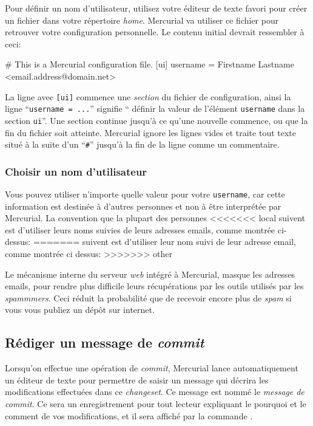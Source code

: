 Pour définir un nom d'utilisateur, utilisez votre éditeur de texte favori
pour créer un fichier  dans votre répertoire \textit{home}.
Mercurial va utiliser ce fichier pour retrouver votre configuration personnelle.
Le contenu initial devrait ressembler à ceci:
\begin{codesample2}
  # This is a Mercurial configuration file.
  [ui]
  username = Firstname Lastname <email.address@domain.net>
\end{codesample2}
La ligne avec \texttt{[ui]} commence une \emph{section} du fichier de
configuration, ainsi la ligne ``\texttt{username = ...}'' signifie ``
définir la valeur de l'élément \texttt{username} dans la section 
\texttt{ui}''. Une section continue jusqu'à ce qu'une nouvelle 
commence, ou que la fin du fichier soit atteinte. Mercurial ignore
les lignes vides et traite tout texte situé à la suite d'un  
``\texttt{\#}'' jusqu'à la fin de la ligne comme un commentaire.

\subsubsection{Choisir un nom d'utilisateur}

Vous pouvez utiliser n'importe quelle valeur pour votre \texttt{username},
car cette information est destinée à d'autres personnes et non à être
interprétée par Mercurial. La convention que la plupart des personnes
<<<<<<< local
suivent est d'utiliser leurs noms suivies de leurs adresses emails,
comme montrée ci-dessus:
=======
suivent est d'utiliser leur nom suivi de leur adresse email,
comme montrée ci dessus:
>>>>>>> other

\begin{note}
  Le mécanisme interne du serveur \textit{web} intégré à Mercurial,
  masque les adresses emails, pour rendre plus difficile leurs
  récupérations par les outils utilisés par les \textit{spammmers}.
  Ceci réduit la probabilité que de recevoir encore plus de 
  \textit{spam} si vous vous publiez un dépôt sur internet.
\end{note}

\subsection{Rédiger un message de \textit{commit}}

Lorsqu'on effectue une opération de \textit{commit}, Mercurial 
lance automatiquement un éditeur de texte pour permettre de saisir
un message qui décrira les modifications effectuées dans ce 
\textit{changeset}. Ce message est nommé le \emph{message de 
\textit{commit}}. Ce sera un enregistrement pour tout lecteur 
expliquant le pourquoi et le comment de vos modifications, et il sera
affiché par la commande .

